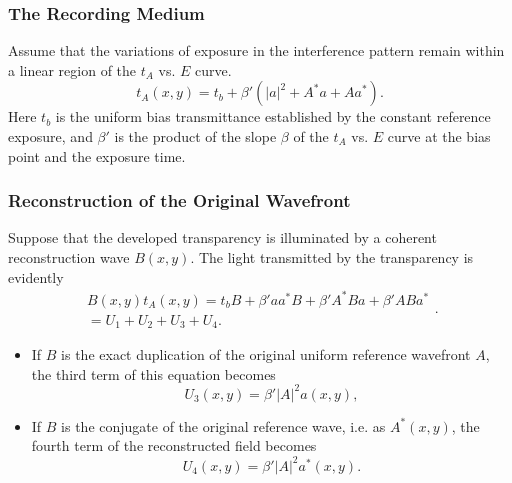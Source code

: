 \documentclass[en,hazy,device=normal,blue,14pt]{elegantnote}
\begin{document}
\subsubsection{The Recording Medium}
Assume that the variations of exposure in the interference pattern remain within a linear region of the $t_A$ vs. $E$ curve.
\begin{equation}
  t_A\left(x,y\right)=t_b+\beta'\left(\left|a\right|^2+A^*a+Aa^*\right).
\end{equation}
Here $t_b$ is the uniform bias transmittance established by the constant reference exposure, and $\beta'$ is the product of the slope $\beta$ of the $t_A$ vs. $E$ curve at the bias point and the exposure time.
\subsubsection{Reconstruction of the Original Wavefront}
Suppose that the developed transparency is illuminated by a coherent reconstruction wave $B(x, y)$. The light transmitted by the transparency is evidently
\begin{equation}
  \begin{array}{c}
    B\left( {x,y} \right){t_A}\left( {x,y} \right) = {t_b}B + \beta 'a{a^*}B + \beta '{A^*}Ba + \beta 'AB{a^*}\\
     = {U_1} + {U_2} + {U_3} + {U_4}.
    \end{array}.
\end{equation}
\begin{itemize}
  \item If $B$ is the exact duplication of the original uniform reference wavefront $A$, the third term of this equation becomes
  \begin{equation}
    U_3\left(x,y\right)=\beta'\left|A\right|^2a\left(x,y\right),
  \end{equation}
  \item If $B$ is the conjugate of the original reference wave, i.e. as $A^*(x, y)$, the fourth term of the reconstructed field becomes
  \begin{equation}
    {U_4}\left( {x,y} \right) = \beta '{\left| A \right|^2}{a^*}\left( {x,y} \right).
  \end{equation}
\end{itemize}
\end{document}
